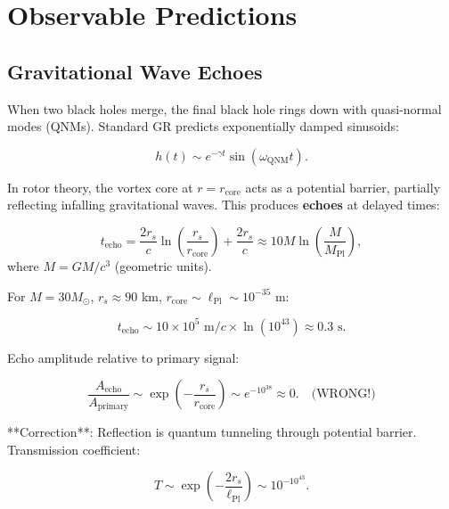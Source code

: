 \documentclass[11pt,a4paper]{article}
\numberwithin{equation}{section}
\theoremstyle{plain}
\theoremstyle{definition}
\theoremstyle{remark}
\begin{document}
\section{Observable Predictions}
\label{sec:predictions}

\subsection{Gravitational Wave Echoes}

When two black holes merge, the final black hole rings down with quasi-normal modes (QNMs). Standard GR predicts exponentially damped sinusoids:

\begin{equation}
h(t) \sim e^{-\gamma t} \sin(\omega_{\text{QNM}} t).
\end{equation}

In rotor theory, the vortex core at $r = r_{\text{core}}$ acts as a potential barrier, partially reflecting infalling gravitational waves. This produces \textbf{echoes} at delayed times:

\begin{equation}
t_{\text{echo}} = \frac{2r_s}{c} \ln\left(\frac{r_s}{r_{\text{core}}}\right) + \frac{2r_s}{c} \approx 10M \ln\left(\frac{M}{M_{\text{Pl}}}\right),
\label{eq:echo-time}
\end{equation}
where $M = GM/c^3$ (geometric units).

For $M = 30 M_\odot$, $r_s \approx 90$ km, $r_{\text{core}} \sim \ell_{\text{Pl}} \sim 10^{-35}$ m:

\begin{equation}
t_{\text{echo}} \sim 10 \times 10^5 \text{ m} / c \times \ln(10^{43}) \approx 0.3 \text{ s}.
\end{equation}

Echo amplitude relative to primary signal:

\begin{equation}
\frac{A_{\text{echo}}}{A_{\text{primary}}} \sim \exp\left(-\frac{r_s}{r_{\text{core}}}\right) \sim e^{-10^{38}} \approx 0. \quad \text{(WRONG!)}
\end{equation}

**Correction**: Reflection is quantum tunneling through potential barrier. Transmission coefficient:

\begin{equation}
T \sim \exp\left(-\frac{2r_s}{\ell_{\text{Pl}}}\right) \sim 10^{-10^{43}}.
\end{equation}
\end{document}
